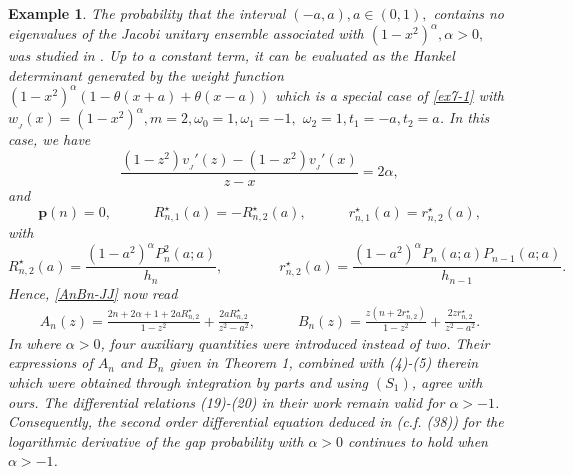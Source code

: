 \documentclass[12pt,a4paper]{article}    %
\newtheorem{exm}{Example}
\numberwithin{equation}{section}
\begin{document}
\begin{exm}
The probability that the interval $(-a,a), a\in(0,1),$ contains no eigenvalues of the Jacobi unitary ensemble associated with $(1-x^2)^{\alpha},\alpha>0,$ was studied in \cite{MinChen2017}. Up to a constant term, it can be evaluated as the Hankel determinant generated by the weight function $(1-x^2)^{\alpha}(1-\theta(x+a)+\theta(x-a))$ which is a special case of \eqref{ex7-1} with $w_{_J}(x)=(1-x^2)^{\alpha}, m=2, \omega_0=1,\omega_1=-1,$ $\omega_2=1, t_1=-a,t_2=a$. In this case, we have
\[\frac{(1-z^2)v_{_J}'(z)-(1-x^2)v_{_J}'(x)}{z-x}=2\alpha,\]
and
\[\mathbf{p}(n)=0,\qquad\quad R_{n,1}^{\star}(a)=-R_{n,2}^{\star}(a),\qquad\quad r_{n,1}^{\star}(a)=r_{n,2}^{\star}(a),\]
with
\[R_{n,2}^{\star}(a)=\frac{(1-a^2)^{\alpha}P_n^2(a;a)}{h_n},\qquad\qquad r_{n,2}^{\star}(a)=\frac{(1-a^2)^{\alpha}P_n(a;a)P_{n-1}(a;a)}{h_{n-1}}.\]
Hence, \eqref{AnBn-JJ} now read
\begin{align*}
A_n(z)=\frac{2n+2\alpha+1+2aR_{n,2}^{\star}}{1-z^2}+\frac{2aR_{n,2}^{\star}}{z^2-a^2},\qquad\quad B_n(z)=\frac{z\left(n+2r_{n,2}^{\star}\right)}{1-z^2}+\frac{2zr_{n,2}^{\star}}{z^2-a^2}.
\end{align*}
In \cite{MinChen2017} where $\alpha>0$, four auxiliary quantities were introduced instead of two. Their expressions of $A_n$ and $B_n$ given in Theorem 1, combined with (4)-(5) therein which were obtained through integration by parts and using $(S_1)$, agree with ours. The differential relations (19)-(20) in their work remain valid for $\alpha>-1$. Consequently, the second order differential equation deduced in \cite{MinChen2017} (c.f. (38)) for the logarithmic derivative of the gap probability with $\alpha>0$ continues to hold when $\alpha>-1$.
\end{exm}
\end{document}
